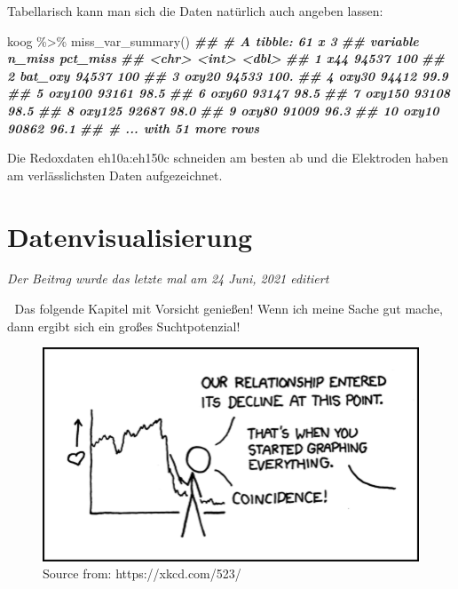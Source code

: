 \documentclass[
]{article}
\newenvironment{Shaded}{\begin{snugshade}}{\end{snugshade}}
\newcommand{\DocumentationTok}[1]{\textcolor[rgb]{0.56,0.35,0.01}{\textbf{\textit{#1}}}}
\newcommand{\FunctionTok}[1]{\textcolor[rgb]{0.00,0.00,0.00}{#1}}
\newcommand{\NormalTok}[1]{#1}
\newcommand{\SpecialCharTok}[1]{\textcolor[rgb]{0.00,0.00,0.00}{#1}}
\begin{document}
Tabellarisch kann man sich die Daten natürlich auch angeben lassen:

\begin{Shaded}
\begin{Highlighting}[]
\NormalTok{koog }\SpecialCharTok{\%\textgreater{}\%}
  \FunctionTok{miss\_var\_summary}\NormalTok{()}
\DocumentationTok{\#\# \# A tibble: 61 x 3}
\DocumentationTok{\#\#    variable n\_miss pct\_miss}
\DocumentationTok{\#\#    \textless{}chr\textgreater{}     \textless{}int\textgreater{}    \textless{}dbl\textgreater{}}
\DocumentationTok{\#\#  1 x44       94537    100  }
\DocumentationTok{\#\#  2 bat\_oxy   94537    100  }
\DocumentationTok{\#\#  3 oxy20     94533    100. }
\DocumentationTok{\#\#  4 oxy30     94412     99.9}
\DocumentationTok{\#\#  5 oxy100    93161     98.5}
\DocumentationTok{\#\#  6 oxy60     93147     98.5}
\DocumentationTok{\#\#  7 oxy150    93108     98.5}
\DocumentationTok{\#\#  8 oxy125    92687     98.0}
\DocumentationTok{\#\#  9 oxy80     91009     96.3}
\DocumentationTok{\#\# 10 oxy10     90862     96.1}
\DocumentationTok{\#\# \# ... with 51 more rows}
\end{Highlighting}
\end{Shaded}

Die Redoxdaten eh10a:eh150c schneiden am besten ab und die Elektroden haben am verlässlichsten Daten aufgezeichnet.

\hypertarget{datenvisualisierung}{%
\section{Datenvisualisierung}\label{datenvisualisierung}}

\emph{Der Beitrag wurde das letzte mal am 24 Juni, 2021 editiert}

🚨 Das folgende Kapitel mit Vorsicht genießen! Wenn ich meine Sache gut mache, dann ergibt sich ein großes Suchtpotenzial!

\begin{figure}

{\centering \includegraphics[width=5.9in]{images/050} 

}

\caption{Source from: https://xkcd.com/523/}\label{fig:unnamed-chunk-164}
\end{figure}
\end{document}
